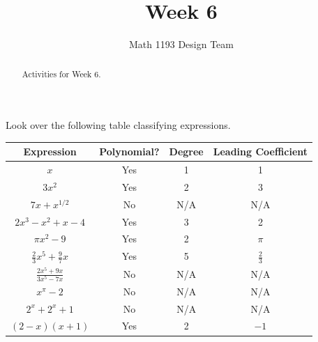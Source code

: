 \documentclass[noauthor,noinstructornotes]{ximera}
\title{Week 6}
\author{Math 1193 Design Team}
\begin{document}
\begin{abstract}
    Activities for Week 6.
\end{abstract}
\maketitle

\begin{problem}
Look over the following table classifying expressions.

\begin{center}
\begin{tabular}{|c|c|c|c|} 
 \hline
 Expression & Polynomial? & Degree & Leading Coefficient \\
 \hline\hline
 \(x\) & Yes & 1 & 1 \\ 
 \hline
 \(3x^2\) & Yes & 2 & 3 \\
 \hline
 \(7x + x^{1/2}\) & No & N/A & N/A \\
 \hline
 \(2x^3 - x^2 + x - 4\) & Yes & 3 & 2 \\
 \hline
 \(\pi x^2 - 9\) & Yes & 2 & \(\pi\) \\
 \hline
 \(\frac{2}{3}x^5 + \frac{9}{7}x\) & Yes & 5 & \(\frac{2}{3}\) \\
 \hline
 \(\frac{2x^5 + 9x}{3x^5 - 7x}\) & No & N/A & N/A \\
 \hline
 \(x^\pi - 2\) & No & N/A & N/A \\
 \hline
 \(2^x + 2^x + 1\) & No & N/A & N/A \\
 \hline
 \((2 - x)(x + 1)\) & Yes & 2 & \(-1\) \\
 \hline
\end{tabular}
\end{center}


\end{problem}
\end{document}
